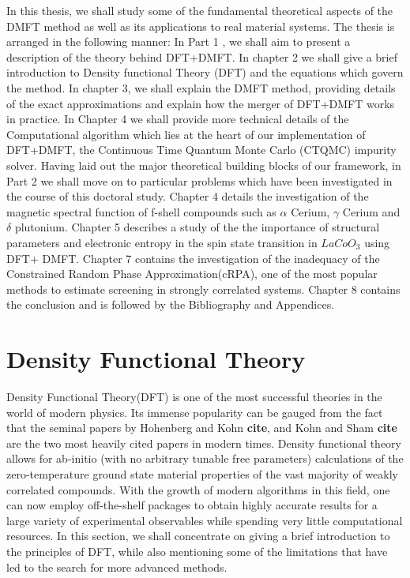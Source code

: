 \documentclass[10pt]{ruthesis}
\begin{document}
In this thesis, we shall study some of the fundamental theoretical aspects of the DMFT method as well as its applications to real material systems. The thesis is arranged in the following manner: In Part 1 , we shall aim to present a description of the theory behind DFT+DMFT. In chapter 2 we shall give a brief introduction to Density functional Theory (DFT) and the equations which govern the method. In chapter 3, we shall explain the DMFT method, providing details of the exact approximations and explain how the merger of DFT+DMFT works in practice. In Chapter 4 we shall provide more technical details of the Computational algorithm which lies at the heart of our implementation of DFT+DMFT, the Continuous Time Quantum Monte Carlo (CTQMC) impurity solver. Having laid out the major theoretical building blocks of our framework, in Part 2 we shall move on to particular problems which have been investigated in the course of this doctoral study. Chapter 4 details the investigation of the magnetic spectral function of f-shell compounds such as $\alpha$ Cerium, $\gamma$ Cerium and $\delta$ plutonium. Chapter 5 describes a study of the the importance of structural parameters and electronic entropy in the spin state transition in $LaCoO_3$ using DFT+ DMFT. Chapter 7 contains the investigation of the inadequacy of the Constrained Random Phase Approximation(cRPA), one of the most popular methods to estimate screening in strongly correlated systems. Chapter 8 contains the conclusion and is followed by the Bibliography and Appendices.


\pagebreak
\chapter{Density Functional Theory}

Density Functional Theory(DFT) is one of the most successful theories in the world of modern physics. Its immense popularity can be gauged from the fact that the seminal papers  by Hohenberg and Kohn \textbf{cite}, and Kohn and Sham \textbf{cite} are the two most heavily cited papers in modern times. Density functional theory allows for ab-initio (with no arbitrary tunable free parameters) calculations of the zero-temperature ground state material properties of the vast majority of weakly correlated compounds. With the growth of modern algorithms in this field, one can now employ off-the-shelf packages to obtain highly accurate results for a large variety of experimental observables while spending very little computational resources. In this section, we shall concentrate on giving a brief introduction to the principles of DFT, while also mentioning some of the limitations that have led to the search for more advanced methods.
\end{document}

